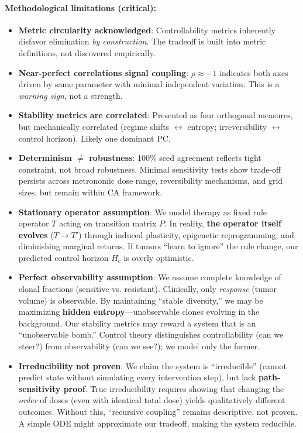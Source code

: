 \documentclass[11pt,a4paper]{article}
\begin{document}
\paragraph{Methodological limitations (critical):}
\begin{itemize}
    \item \textbf{Metric circularity acknowledged}: Controllability metrics inherently disfavor elimination \textit{by construction}. The tradeoff is built into metric definitions, not discovered empirically.
    \item \textbf{Near-perfect correlations signal coupling}: $\rho \approx -1$ indicates both axes driven by same parameter with minimal independent variation. This is a \textit{warning sign}, not a strength.
    \item \textbf{Stability metrics are correlated}: Presented as four orthogonal measures, but mechanically correlated (regime shifts $\leftrightarrow$ entropy; irreversibility $\leftrightarrow$ control horizon). Likely one dominant PC.
    \item \textbf{Determinism $\neq$ robustness}: 100\% seed agreement reflects tight constraint, not broad robustness. Minimal sensitivity tests show trade-off persists across metronomic dose range, reversibility mechanisms, and grid sizes, but remain within CA framework.
    \item \textbf{Stationary operator assumption}: We model therapy as fixed rule operator $T$ acting on transition matrix $P$. In reality, \textbf{the operator itself evolves} ($T \to T'$) through induced plasticity, epigenetic reprogramming, and diminishing marginal returns. If tumors ``learn to ignore'' the rule change, our predicted control horizon $H_c$ is overly optimistic.
    \item \textbf{Perfect observability assumption}: We assume complete knowledge of clonal fractions (sensitive vs. resistant). Clinically, only \textit{response} (tumor volume) is observable. By maintaining ``stable diversity,'' we may be maximizing \textbf{hidden entropy}---unobservable clones evolving in the background. Our stability metrics may reward a system that is an ``unobservable bomb.'' Control theory distinguishes controllability (can we steer?) from observability (can we see?); we model only the former.
    \item \textbf{Irreducibility not proven}: We claim the system is ``irreducible'' (cannot predict state without simulating every intervention step), but lack \textbf{path-sensitivity proof}. True irreducibility requires showing that changing the \textit{order} of doses (even with identical total dose) yields qualitatively different outcomes. Without this, ``recursive coupling'' remains descriptive, not proven. A simple ODE might approximate our tradeoff, making the system reducible.

\end{itemize}
\end{document}
